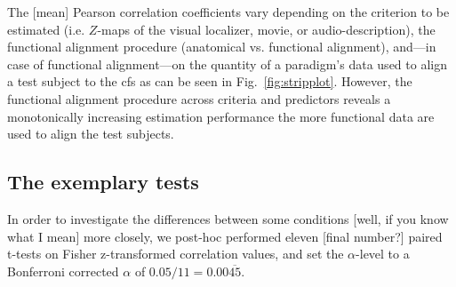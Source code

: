 

%
The [mean] Pearson correlation coefficients vary depending on the criterion to
be estimated (i.e. $Z$-maps of the visual localizer, movie, or
audio-description), the functional alignment procedure (anatomical vs.
functional alignment), and---in case of functional alignment---on the quantity
of a paradigm's data used to align a test subject to the \ac{cfs} as can be seen
in Fig.~\ref{fig:stripplot}.
%
However, the functional alignment procedure across criteria and predictors
reveals a monotonically increasing estimation performance the more functional
data are used to align the test subjects.


\subsection{The exemplary tests}









%
In order to investigate the differences between some conditions [well, if you
know what I mean] more closely, we post-hoc
performed eleven [final number?] paired t-tests on Fisher z-transformed
correlation values, and set the $\alpha$-level to a Bonferroni corrected
$\alpha$ of $0.05 / 11 = 0.00\overline{45}$.

